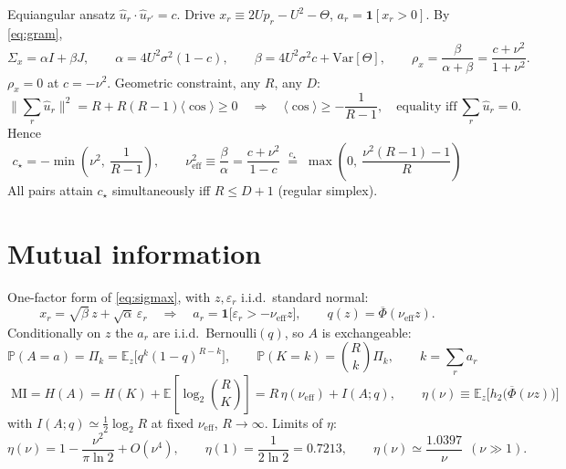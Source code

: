 \documentclass[11pt,a4paper]{article}
\newcommand{\EE}{\mathbb{E}}
\newcommand{\PP}{\mathbb{P}}
\newcommand{\Var}{\mathrm{Var}}
\newcommand{\Phibar}{\overline{\Phi}}
\newcommand{\htwo}{h_2}
\newcommand{\uhat}{\hat{u}}
\newcommand{\nueff}{\nu_{\mathrm{eff}}}
\begin{document}
Equiangular ansatz $\uhat_r\cdot\uhat_{r'}=c$. Drive $x_r\equiv 2Up_r-U^2-\Theta$,
$a_r=\mathbf 1[x_r>0]$. By \eqref{eq:gram},
\begin{equation}
  \Sigma_x=\alpha I+\beta J,
  \qquad
  \alpha=4U^2\sigma^2(1-c),
  \qquad
  \beta=4U^2\sigma^2 c+\Var[\Theta],
  \qquad
  \rho_x=\frac{\beta}{\alpha+\beta}=\frac{c+\nu^2}{1+\nu^2}.
  \label{eq:sigmax}
\end{equation}
$\rho_x=0$ at $c=-\nu^2$. Geometric constraint, any $R$, any $D$:
\begin{equation}
  \Big\|\sum_r\uhat_r\Big\|^2=R+R(R-1)\langle\cos\rangle\ge0
  \quad\Longrightarrow\quad
  \langle\cos\rangle\ge-\frac{1}{R-1},
  \quad\text{equality iff}\ \sum_r\uhat_r=0 .
  \label{eq:floor}
\end{equation}
Hence
\begin{equation}
  \boxed{\;
  c_\star=-\min\!\left(\nu^2,\ \frac{1}{R-1}\right),
  \qquad
  \nueff^2\equiv\frac{\beta}{\alpha}=\frac{c+\nu^2}{1-c}
  \;\overset{c_\star}{=}\;
  \max\!\left(0,\ \frac{\nu^2(R-1)-1}{R}\right) \;}
  \label{eq:cstar}
\end{equation}
All pairs attain $c_\star$ simultaneously iff $R\le D+1$ (regular simplex).

\section{Mutual information}

One-factor form of \eqref{eq:sigmax}, with $z,\varepsilon_r$ i.i.d.\ standard normal:
\begin{equation}
  x_r=\sqrt\beta\,z+\sqrt\alpha\,\varepsilon_r
  \quad\Longrightarrow\quad
  a_r=\mathbf 1\big[\varepsilon_r>-\nueff z\big],
  \qquad
  q(z)=\Phibar(\nueff z).
  \label{eq:onefactor}
\end{equation}
Conditionally on $z$ the $a_r$ are i.i.d.\ Bernoulli$(q)$, so $A$ is exchangeable:
\begin{equation}
  \PP(A=a)=\Pi_k=\EE_z\big[q^k(1-q)^{R-k}\big],
  \qquad
  \PP(K=k)=\binom{R}{k}\Pi_k,
  \qquad k=\textstyle\sum_r a_r
  \label{eq:PK}
\end{equation}
\begin{equation}
  \boxed{\;
  \mathrm{MI}=H(A)=H(K)+\EE\!\left[\log_2\binom{R}{K}\right]
  = R\,\eta(\nueff)+I(A;q),
  \qquad
  \eta(\nu)\equiv\EE_z\big[\htwo\big(\Phibar(\nu z)\big)\big] \;}
  \label{eq:MI}
\end{equation}
with $I(A;q)\simeq\tfrac12\log_2R$ at fixed $\nueff$, $R\to\infty$. Limits of $\eta$:
\begin{equation}
  \eta(\nu)=1-\frac{\nu^2}{\pi\ln2}+O(\nu^4),
  \qquad
  \eta(1)=\frac{1}{2\ln2}=0.7213,
  \qquad
  \eta(\nu)\simeq\frac{1.0397}{\nu}\ \ (\nu\gg1).
  \label{eq:etalimits}
\end{equation}
\end{document}
